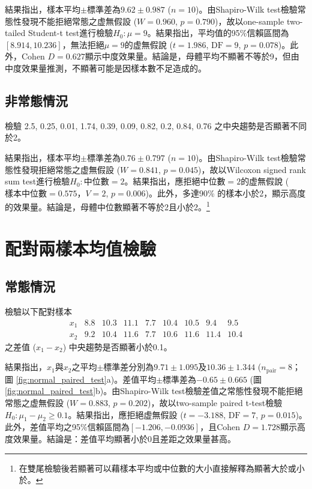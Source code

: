 \documentclass[12pt]{article}
\begin{document}
結果指出，樣本平均$\pm$標準差為$9.62 \pm 0.987$ ($n = 10$)。由Shapiro-Wilk test檢驗常態性發現不能拒絕常態之虚無假設 ($W = 0.960$, $p = 0.790$)，故以one-sample two-tailed Student-t test進行檢驗$H_0: \mu=9$。結果指出，平均值的95\%信賴區間為$\left[8.914, 10.236\right]$，無法拒絕$\mu = 9$的虚無假說 ($t = 1.986$, $\text{DF} = 9$, $p = 0.078$)。此外，Cohen $D = 0.627$顯示中度效果量。結論是，母體平均不顯著不等於9，但由中度效果量推測，不顯著可能是因樣本數不足造成的。

\subsection{非常態情況}
檢驗 2.5, 0.25, 0.01, 1.74, 0.39, 0.09, 0.82, 0.2, 0.84, 0.76 之中央趨勢是否顯著不同於2。

結果指出，樣本平均$\pm$標準差為$0.76 \pm 0.797$ ($n = 10$)。由Shapiro-Wilk test檢驗常態性發現拒絕常態之虚無假設 ($W = 0.841$, $p = 0.045$)，故以Wilcoxon signed rank sum test進行檢驗$H_0: \text{中位數}=2$。結果指出，應拒絕中位數$=2$的虚無假說 ($\text{樣本中位數}=0.575$，$V = 2$, $p = 0.006$)。此外，多達90\% 的樣本小於2，顯示高度的效果量。結論是，母體中位數顯著不等於2且小於2。\footnote{在雙尾檢驗後若顯著可以藉樣本平均或中位數的大小直接解釋為顯著大於或小於。}

\section{配對兩樣本均值檢驗}
\subsection{常態情況}
檢驗以下配對樣本
\[
\begin{matrix}
x_1 & 8.8 & 10.3 & 11.1 & 7.7 &10.4 & 10.5 & 9.4 & 9.5 \\
x_2 & 9.2 & 10.4 & 11.6 & 7.7 & 10.6 & 11.6 & 11.4 & 10.4
\end{matrix}
\]
之差值 ($x_1 - x_2$) 中央趨勢是否顯著小於0.1。

結果指出，$x_1$與$x_2$之平均$\pm$標準差分別為$9.71 \pm 1.095$及$10.36 \pm 1.344$ ($n_\mathrm{pair} = 8$； 圖 \ref{fig:normal_paired_test}a)。差值平均$\pm$標準差為$-0.65\pm0.665$  (圖 \ref{fig:normal_paired_test}b)。由Shapiro-Wilk test檢驗差值之常態性發現不能拒絕常態之虚無假設 ($W = 0.883$, $p = 0.202$)，故以two-sample paired t-test檢驗$H_0: \mu_1 - \mu_2 \geq 0.1$。結果指出，應拒絕虚無假設 ($t = -3.188$, $\text{DF} = 7$, $p = 0.015$)。此外，差值平均之95\%信賴區間為$\left[-1.206, -0.0936\right]$，且Cohen $D = 1.728$顯示高度效果量。結論是：差值平均顯著小於0且差距之效果量甚高。
\end{document}
